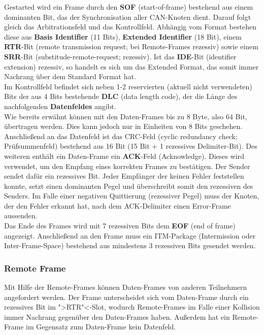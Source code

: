 Gestarted wird ein Frame durch den \textbf{SOF} (start-of-frame)
bestehend aus einem dominanten Bit, das der Synchronisation aller CAN-Knoten dient. Darauf folgt gleich das
Arbitrationsfeld und das Kontrollfeld. Abhängig vom Format bestehen
diese aus \textbf{Basis Identifier} (11 Bits), \textbf{Extended
Identifier} (18 Bit), einem \textbf{RTR}-Bit (remote transmission
request; bei Remote-Frames rezessiv) sowie einem \textbf{SRR}-Bit
(substitude-remote-request; rezessiv). Ist das \textbf{IDE}-Bit
(identifier extension) rezessiv, so handelt es sich um das Extended
Format, das somit immer Nachrang über dem Standard Format hat.\\ Im
Kontrollfeld befindet sich neben 1-2 reservierten (aktuell nicht
verwendeten) Bits der aus 4 Bits bestehende \textbf{DLC} (data length
code), der die Länge des nachfolgenden \textbf{Datenfeldes} angibt.\\
Wie bereits erwähnt können mit den Daten-Frames bis zu 8 Byte, also 64
Bit, übertragen werden. Dies kann jedoch nur in Einheiten von 8 Bits
geschehen. Anschließend an das Datenfeld ist das CRC-Feld (cyclic
redundancy check; Prüfsummenfeld) bestehend aus 16 Bit (15 Bit + 1
rezessives Delimiter-Bit). Des weiteren enthält ein Daten-Frame ein
\textbf{ACK}-Feld (Acknowledge). Dieses wird verwendet, um den Empfang
eines korrekten Frames zu bestätigen. Der Sender sendet dafür ein
rezessives Bit. Jeder Empfänger der keinen Fehler feststellen konnte,
setzt einen dominanten Pegel und überschreibt somit den rezessiven des
Senders. Im Falle einer negativen Quittierung (rezessiver Pegel) muss
der Knoten, der den Fehler erkannt hat, nach dem ACK-Delimiter einen
Error-Frame aussenden.\\Das Ende des Frames wird mit 7 rezessiven Bits
dem \textbf{EOF} (end of frame) angezeigt. Anschließend an den Frame
muss ein ITM-Package (Intermission oder Inter-Frame-Space) bestehend
aus mindestens 3 rezessiven Bits gesendet werden.
	
\subsubsection{Remote Frame} Mit Hilfe der Remote-Frames können
Daten-Frames von anderen Teilnehmern angefordert werden. Der Frame
unterscheidet sich vom Daten-Frame durch ein rezessives Bit im
">RTR"<-Slot, wodurch Remote-Frames im Falle einer Kollision immer
Nachrang gegenüber den Daten-Frames haben. Außerdem hat ein Remote-Frame im Gegensatz zum Daten-Frame kein Datenfeld.
	

